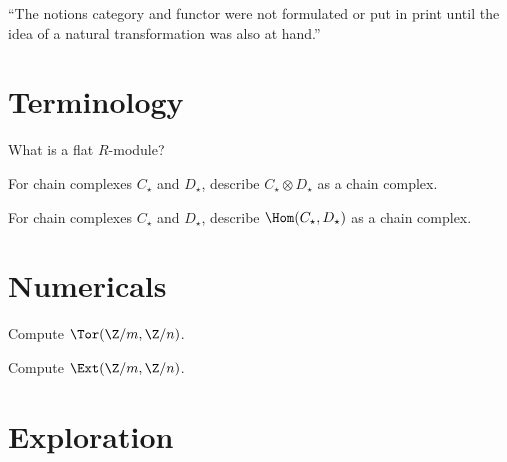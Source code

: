 \documentclass{homework}
\author{Jim Fowler}
\begin{document}
\maketitle

\begin{inspiration}
``The notions category and functor were not formulated or put in print until the idea of a natural transformation was also at hand.''
\end{inspiration}

\section{Terminology}

\begin{problem}
  What is a flat $R$-module?
\end{problem}

\begin{problem} For chain complexes $C_\star$ and $D_\star$, describe
$C_\star \otimes D_\star$ as a chain complex.
\end{problem}

\begin{problem} For chain complexes $C_\star$ and $D_\star$, describe
$\Hom(C_\star,D_\star)$ as a chain complex.
\end{problem}

\section{Numericals}

\begin{problem}
  Compute $\Tor(\Z/m,\Z/n)$.
\end{problem}

\begin{problem}
  Compute $\Ext(\Z/m,\Z/n)$.
\end{problem}

\section{Exploration}
\end{document}
